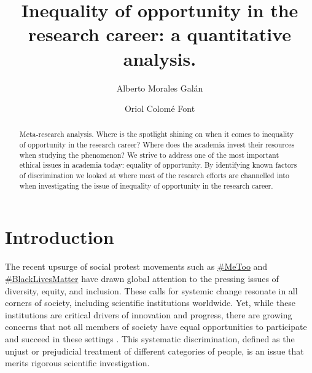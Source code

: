 \documentclass[runningheads]{llncs}
\begin{document}
\title{Inequality of opportunity in the research career: a quantitative analysis.}
\author{Alberto Morales Galán
\and
Oriol Colomé Font}
\maketitle              %
\begin{abstract}
Meta-research analysis. Where is the spotlight shining on when it comes to inequality of opportunity in the research career? Where does the academia invest their resources when studying the phenomenon? 
We strive to address one of the most important ethical issues in academia today: equality of opportunity. By identifying known factors of discrimination we looked at where most of the research efforts are channelled into when investigating the issue of inequality of opportunity in the research career.

\end{abstract}
\section{Introduction}
The recent upsurge of social protest movements such as \href{https://hipatiapress.com/hpjournals/index.php/hse/article/view/10545/3659}{\#MeToo} and \href{https://doi.org/10.1016/j.jnma.2021.12.009}{\#BlackLivesMatter} have drawn global attention to the pressing issues of diversity, equity, and inclusion. These calls for systemic change resonate in all corners of society, including scientific institutions worldwide. Yet, while these institutions are critical drivers of innovation and progress, there are growing concerns that not all members of society have equal opportunities to participate and succeed in these settings \cite{ref1}. This systematic discrimination, defined as the unjust or prejudicial treatment of different categories of people, is an issue that merits rigorous scientific investigation.
\end{document}
